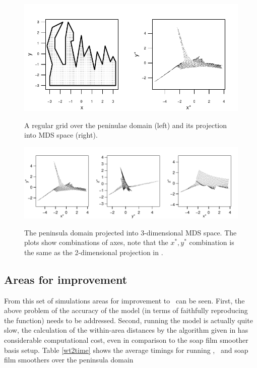 \begin{figure}
\centering
\includegraphics[width=6in]{mds/figs/wt2-2d-proj.pdf} \\
\caption{A regular grid over the peninulae domain (left) and its projection into MDS space (right).}
\label{wt2-2d-proj}
\end{figure}

\begin{figure}
\centering
\includegraphics[width=9in]{mds/figs/wt2-3d-proj.pdf} \\
\caption{The peninsula domain projected into 3-dimensional MDS space. The plots show combinations of axes, note that the $x^*,y^*$ combination is the same as the 2-dimensional projection in .}
\label{wt2-3d-proj}
\end{figure}

\subsection{Areas for improvement}

From this set of simulations areas for improvement to \mdsap\ can be seen. First, the above problem of the accuracy of the model (in terms of faithfully reproducing the function) needs to be addressed. Second, running the model is actually quite slow, the calculation of the within-area distances by the algorithm given in  has considerable computational cost, even in comparison to the soap film smoother basis setup. Table \ref{wt2time} shows the average timings for running \mdsap, \tprs\ and soap film smoothers over the peninsula domain

